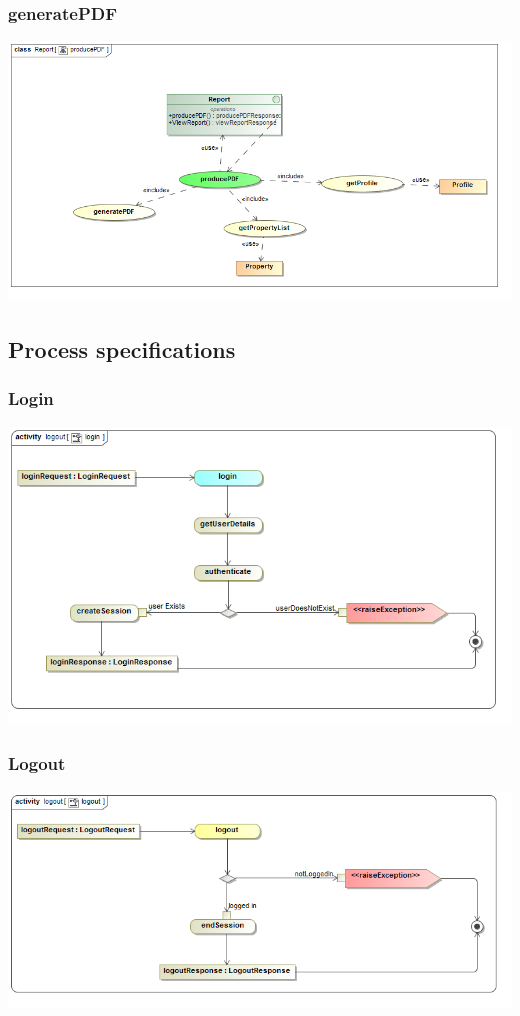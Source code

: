 \documentclass[a4paper,12pt]{article}
\begin{document}
\subsubsection{generatePDF}
\includegraphics[width=1\textwidth]{./Images/newDiagrams/requiredFunctionality/Sandile/producePDFFR.png}


\subsection{Process specifications}
\subsubsection{Login}
\includegraphics[width=1\textwidth]{./Images/newDiagrams/processSpecification/Diana/login.png}
\subsubsection{Logout}
\includegraphics[width=1\textwidth]{./Images/newDiagrams/processSpecification/Diana/logout.png}
\end{document}
